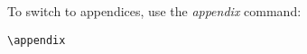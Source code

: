 To switch to appendices, use the \emph{appendix} command:

\begin{lstlisting}
\appendix


\end{lstlisting}